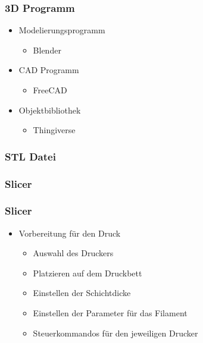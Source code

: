 {
\begin{frame}
  \frametitle{3D Programm}
  \begin{itemize}
    \item Modelierungsprogramm \pause
    \begin{itemize}
      \item Blender \pause
    \end{itemize}
    \item CAD Programm \pause
    \begin{itemize}
      \item FreeCAD \pause
    \end{itemize}
    \item Objektbibliothek \pause
    \begin{itemize}
      \item Thingiverse
    \end{itemize}
  \end{itemize}
\end{frame}
}
{
\begin{frame}
  \frametitle{STL Datei}
\end{frame}
}
{
\begin{frame}
  \frametitle{Slicer}
\end{frame}
}
{
\begin{frame}
  \frametitle{Slicer}
  \begin{itemize}
    \item Vorbereitung für den Druck \pause
    \begin{itemize}
      \item Auswahl des Druckers \pause
      \item Platzieren auf dem Druckbett \pause
      \item Einstellen der Schichtdicke \pause
      \item Einstellen der Parameter für das Filament \pause
      \item Steuerkommandos für den jeweiligen Drucker
    \end{itemize}
  \end{itemize}
\end{frame}
}
